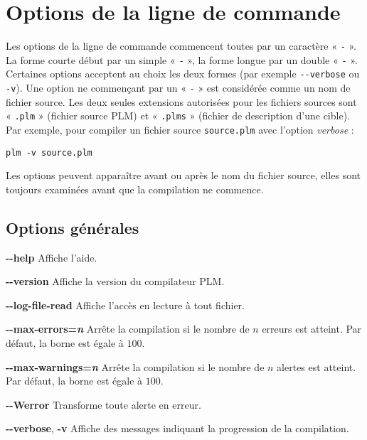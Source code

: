 




\chapter{Options de la ligne de commande}

Les options de la ligne de commande commencent toutes par un caractère « \texttt{-} ». La forme courte début par un simple « \texttt{-} », la forme longue par un double « \texttt{-} ». Certaines options acceptent au choix les deux formes (par exemple \texttt{-{}-verbose} ou \texttt{-v}). Une option ne commençant par un « \texttt{-} » est considérée comme un nom de fichier source. Les deux seules extensions autorisées pour les fichiers sources sont « \texttt{.plm} » (fichier source PLM) et  « \texttt{.plms} » (fichier de description d'une cible). Par exemple, pour compiler un fichier source \texttt{source.plm} avec l'option \emph{verbose} :

\texttt{plm -v source.plm}

Les options peuvent apparaître avant ou après le nom du fichier source, elles sont toujours examinées avant que la compilation ne commence.


\section{Options générales}

\textbf{-{}-help} Affiche l'aide.


\textbf{-{}-version} Affiche la version du compilateur PLM.



\textbf{-{}-log-file-read} Affiche l'accès en lecture à tout fichier.

\textbf{-{}-max-errors=\emph{n}} Arrête la compilation si le nombre de $n$ erreurs est atteint. Par défaut, la borne est égale à $100$.

\textbf{-{}-max-warnings=\emph{n}} Arrête la compilation si le nombre de $n$ alertes est atteint. Par défaut, la borne est égale à $100$.

\textbf{-{}-Werror} Transforme toute alerte en erreur.

\textbf{-{}-verbose}, \textbf{-v} Affiche des messages indiquant la progression de la compilation.








